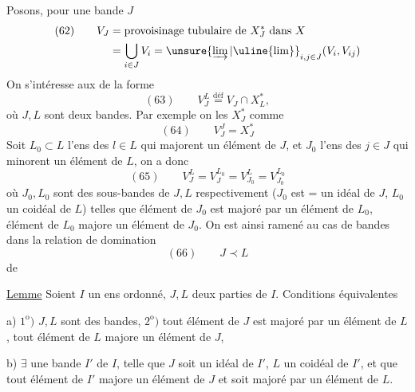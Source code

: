 

Posons, pour une bande $J$
\[
\begin{aligned}
(62)\qquad V_J&=\text{provoisinage tubulaire de }X_J^*\text{ dans }X\\
&=\bigcup_{i\in J}V_i=\unsure{\varinjlim|\uline{\lim}}_{i,j\in J}(V_i,V_{ij})
\end{aligned}
\]
On s'intéresse aux  de la forme
\[
(63)\qquad V_J^L\overset{\mathrm{déf}}{=}V_J\cap X_L^*,
\]
où $J,L$ sont deux bandes. Par exemple on  les $X_J^*$ comme
\[
(64)\qquad V_J^J=X_J^*
\]
Soit $L_0\subset L$ l'ens des $l\in L$ qui majorent un élément de $J$, et $J_0$ l'ens des $j\in J$ qui minorent un élément de $L$, on a donc
\[
(65)\qquad V_J^L=V_J^{L_0}=V_{J_0}^L=V_{J_0}^{L_0}
\]
où $J_0,L_0$ sont des sous-bandes de $J,L$ respectivement ($J_0$ est = un idéal de $J$, $L_0$ un coidéal de $L$) telles que  élément de $J_0$ est majoré par un élément de $L_0$,  élément de $L_0$ majore un élément de $J_0$. On est ainsi ramené au cas de bandes dans la relation de domination
\[
(66)\qquad J\prec L
\]
de


\uline{Lemme} Soient $I$ un ens ordonné, $J,L$ deux parties de $I$. Conditions équivalentes

a) $1^{\mathrm o})$ $J,L$ sont des bandes, $2^{\mathrm o})$ tout élément de $J$ est majoré par un élément de $L$, tout élément de $L$ majore un élément de $J$, 

b) $\exists$ une bande $I'$ de $I$, telle que $J$ soit un idéal de $I'$, $L$ un coidéal de $I'$, et que tout élément de $I'$ majore un élément de $J$ et soit majoré par un élément de $L$.

